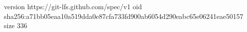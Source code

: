 version https://git-lfs.github.com/spec/v1
oid sha256:a71bb05eaa10a519dda0e87cfa733fd900ab6054d290eabc65e06241eae50157
size 336
